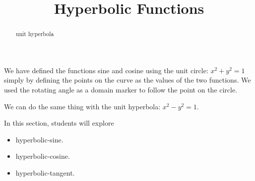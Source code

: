 \documentclass{ximera}
\title{Hyperbolic Functions}
\begin{document}
\begin{abstract}
unit hyperbola
\end{abstract}
\maketitle




We have defined the functions sine and cosine using the unit circle: $x^2 + y^2 = 1$ simply by defining the points on the curve as the values of the two functions.  We used the rotating angle as a domain marker to follow the point on the circle.



We can do the same thing with the unit hyperbola: $x^2 - y^2 = 1$.












\begin{sectionOutcomes}
In this section, students will explore

\begin{itemize}
\item hyperbolic-sine.
\item hyperbolic-cosine.
\item hyperbolic-tangent.
\end{itemize}
\end{sectionOutcomes}
\end{document}
